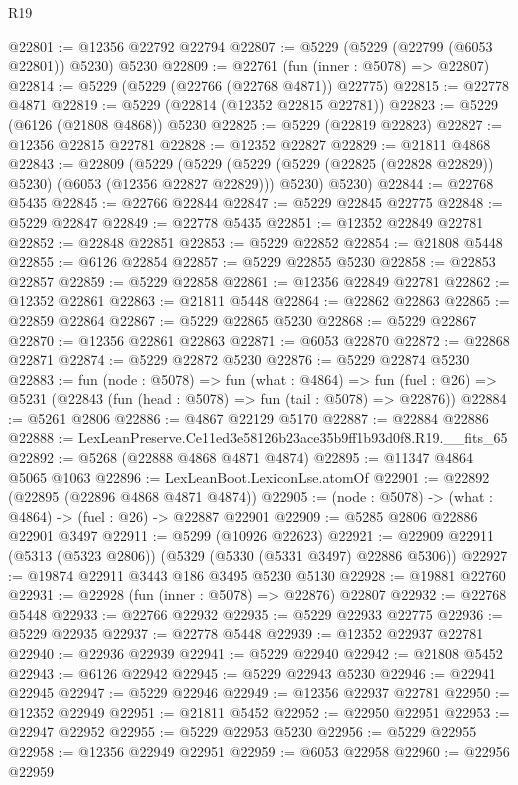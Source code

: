 \begin{lexlean}{R19}
\begin{coremodule}
@22801 := @12356 @22792 @22794
@22807 := @5229 (@5229 (@22799 (@6053 @22801)) @5230) @5230
@22809 := @22761 (fun (inner : @5078) => @22807)
@22814 := @5229 (@5229 (@22766 (@22768 @4871)) @22775)
@22815 := @22778 @4871
@22819 := @5229 (@22814 (@12352 @22815 @22781))
@22823 := @5229 (@6126 (@21808 @4868)) @5230
@22825 := @5229 (@22819 @22823)
@22827 := @12356 @22815 @22781
@22828 := @12352 @22827
@22829 := @21811 @4868
@22843 := @22809
    (@5229
      (@5229 (@5229 (@5229 (@22825 (@22828 @22829)) @5230) (@6053 (@12356 @22827 @22829))) @5230)
      @5230)
@22844 := @22768 @5435
@22845 := @22766 @22844
@22847 := @5229 @22845 @22775
@22848 := @5229 @22847
@22849 := @22778 @5435
@22851 := @12352 @22849 @22781
@22852 := @22848 @22851
@22853 := @5229 @22852
@22854 := @21808 @5448
@22855 := @6126 @22854
@22857 := @5229 @22855 @5230
@22858 := @22853 @22857
@22859 := @5229 @22858
@22861 := @12356 @22849 @22781
@22862 := @12352 @22861
@22863 := @21811 @5448
@22864 := @22862 @22863
@22865 := @22859 @22864
@22867 := @5229 @22865 @5230
@22868 := @5229 @22867
@22870 := @12356 @22861 @22863
@22871 := @6053 @22870
@22872 := @22868 @22871
@22874 := @5229 @22872 @5230
@22876 := @5229 @22874 @5230
@22883 := fun (node : @5078) =>
  fun (what : @4864) =>
  fun (fuel : @26) => @5231 (@22843 (fun (head : @5078) => fun (tail : @5078) => @22876))
@22884 := @5261 @2806
@22886 := @4867 @22129 @5170
@22887 := @22884 @22886
@22888 := LexLeanPreserve.Ce11ed3e58126b23ace35b9ff1b93d0f8.R19.__fits_65
@22892 := @5268 (@22888 @4868 @4871 @4874)
@22895 := @11347 @4864 @5065 @1063
@22896 := LexLeanBoot.LexiconLse.atomOf
@22901 := @22892 (@22895 (@22896 @4868 @4871 @4874))
@22905 := (node : @5078) -> (what : @4864) -> (fuel : @26) -> @22887 @22901
@22909 := @5285 @2806 @22886 @22901 @3497
@22911 := @5299 (@10926 @22623)
@22921 := @22909 @22911 (@5313 (@5323 @2806)) (@5329 (@5330 (@5331 @3497) @22886 @5306))
@22927 := @19874 @22911 @3443 @186 @3495 @5230 @5130
@22928 := @19881 @22760
@22931 := @22928 (fun (inner : @5078) => @22876) @22807
@22932 := @22768 @5448
@22933 := @22766 @22932
@22935 := @5229 @22933 @22775
@22936 := @5229 @22935
@22937 := @22778 @5448
@22939 := @12352 @22937 @22781
@22940 := @22936 @22939
@22941 := @5229 @22940
@22942 := @21808 @5452
@22943 := @6126 @22942
@22945 := @5229 @22943 @5230
@22946 := @22941 @22945
@22947 := @5229 @22946
@22949 := @12356 @22937 @22781
@22950 := @12352 @22949
@22951 := @21811 @5452
@22952 := @22950 @22951
@22953 := @22947 @22952
@22955 := @5229 @22953 @5230
@22956 := @5229 @22955
@22958 := @12356 @22949 @22951
@22959 := @6053 @22958
@22960 := @22956 @22959

\end{coremodule}
\end{lexlean}
